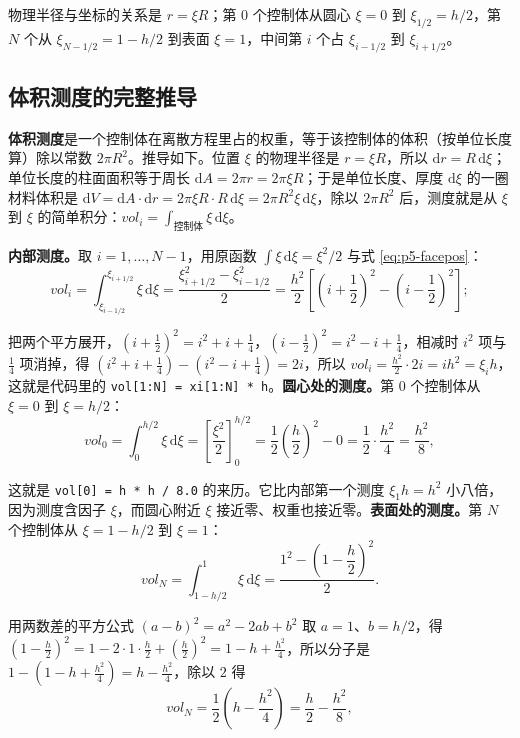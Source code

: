 物理半径与坐标的关系是 $r=\xi R$；第 $0$ 个控制体从圆心 $\xi=0$ 到 $\xi_{1/2}=h/2$，第 $N$ 个从 $\xi_{N-1/2}=1-h/2$ 到表面 $\xi=1$，中间第 $i$ 个占 $\xi_{i-1/2}$ 到 $\xi_{i+1/2}$。

\subsection{体积测度的完整推导}

\textbf{体积测度}是一个控制体在离散方程里占的权重，等于该控制体的体积（按单位长度算）除以常数 $2\pi R^2$。推导如下。位置 $\xi$ 的物理半径是 $r=\xi R$，所以 $\mathrm{d}r=R\,\mathrm{d}\xi$；单位长度的柱面面积等于周长 $\mathrm{d}A=2\pi r=2\pi\xi R$；于是单位长度、厚度 $\mathrm{d}\xi$ 的一圈材料体积是
$\mathrm{d}V=\mathrm{d}A\cdot\mathrm{d}r=2\pi\xi R\cdot R\,\mathrm{d}\xi=2\pi R^2\xi\,\mathrm{d}\xi$，除以 $2\pi R^2$ 后，测度就是从 $\xi$ 到 $\xi$ 的简单积分：$vol_i=\int_{\text{控制体}}\xi\,\mathrm{d}\xi$。

\textbf{内部测度。}取 $i=1,\dots,N-1$，用原函数 $\int\xi\,\mathrm{d}\xi=\xi^2/2$ 与式 \eqref{eq:p5-facepos}：
\begin{equation}
vol_i=\int_{\xi_{i-1/2}}^{\xi_{i+1/2}}\xi\,\mathrm{d}\xi
=\frac{\xi_{i+1/2}^2-\xi_{i-1/2}^2}{2}
=\frac{h^2}{2}\left[\left(i+\frac12\right)^2-\left(i-\frac12\right)^2\right];
\end{equation}

把两个平方展开，$\left(i+\frac12\right)^2=i^2+i+\frac14$，$\left(i-\frac12\right)^2=i^2-i+\frac14$，相减时 $i^2$ 项与 $\frac14$ 项消掉，得 $\left(i^2+i+\frac14\right)-\left(i^2-i+\frac14\right)=2i$，所以 $vol_i=\frac{h^2}{2}\cdot 2i=ih^2=\xi_ih$，这就是代码里的 \texttt{vol[1:N] = xi[1:N] * h}。\textbf{圆心处的测度。}第 $0$ 个控制体从 $\xi=0$ 到 $\xi=h/2$：
\begin{equation}
vol_0=\int_{0}^{h/2}\xi\,\mathrm{d}\xi
=\left[\frac{\xi^2}{2}\right]_{0}^{h/2}
=\frac{1}{2}\left(\frac{h}{2}\right)^2-0
=\frac{1}{2}\cdot\frac{h^2}{4}=\frac{h^2}{8},
\label{eq:p5-vol0}
\end{equation}

这就是 \texttt{vol[0] = h * h / 8.0} 的来历。它比内部第一个测度 $\xi_1h=h^2$ 小八倍，因为测度含因子 $\xi$，而圆心附近 $\xi$ 接近零、权重也接近零。\textbf{表面处的测度。}第 $N$ 个控制体从 $\xi=1-h/2$ 到 $\xi=1$：
\begin{equation}
vol_N=\int_{1-h/2}^{1}\xi\,\mathrm{d}\xi
=\frac{1^2-\left(1-\dfrac{h}{2}\right)^2}{2}.
\end{equation}

用两数差的平方公式 $(a-b)^2=a^2-2ab+b^2$ 取 $a=1$、$b=h/2$，得 $\left(1-\frac h2\right)^2=1-2\cdot1\cdot\frac h2+\left(\frac h2\right)^2=1-h+\frac{h^2}{4}$，所以分子是 $1-\left(1-h+\frac{h^2}{4}\right)=h-\frac{h^2}{4}$，除以 $2$ 得
\begin{equation}
vol_N=\frac{1}{2}\left(h-\frac{h^2}{4}\right)=\frac{h}{2}-\frac{h^2}{8},
\label{eq:p5-volN}
\end{equation}

